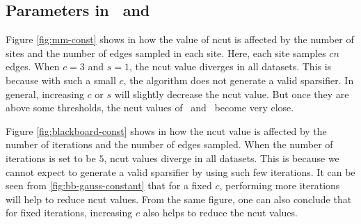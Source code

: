 %
%



\subsection{Parameters in \MM\ and \blackboard}
\label{sec:parameters}

Figure \ref{fig:mm-const} shows in \MM how the value of ncut is affected by the number of sites and the number of edges sampled in each site. 
Here, each site samples $cn$ edges. 
When $c=3$ and $s=1$, the ncut value diverges in all datasets. This is because with such a small $c$, the algorithm does not generate a valid sparsifier. In general, increasing $c$ or $s$ will slightly decrease the ncut value. But once they are above some thresholds, the ncut values of \MM\ and \baseline\ become very close.

Figure \ref{fig:blackboard-const} shows in \blackboard  how the ncut value is affected by the number of iterations and the number of edges sampled. When the number of iterations is set to be $5$, ncut values diverge in all datasets. This is because we cannot expect to generate a valid sparsifier by using such few iterations. It can be seen from \ref{fig:bb-gauss-constant} that for a fixed $c$, performing more iterations will help to reduce ncut values. From the same figure, one can also conclude that for fixed iterations, increasing $c$ also helps to reduce the ncut values.



\begin{figure*}[h!t]
     \centering
     \caption{The pictures above show the $\ncut$ values with respect to the values of $c$ and $s$ for the \MM\ algorithm. Here  
 each site samples $c n$ edges.}
     \label{fig:mm-const}
\end{figure*}


